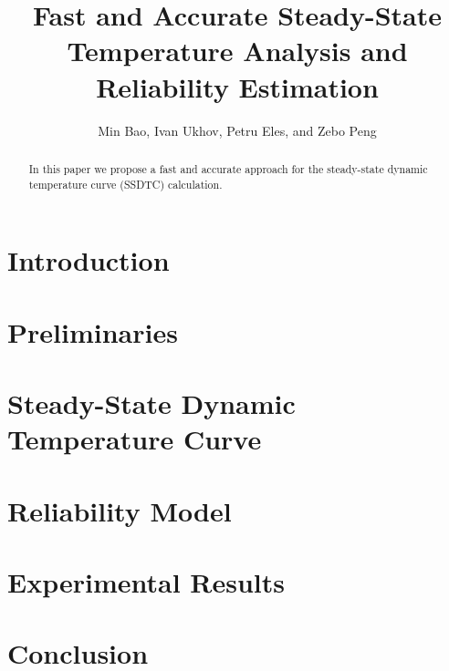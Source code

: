 \documentclass[conference]{IEEEtran}
\title{Fast and Accurate Steady-State Temperature Analysis and Reliability Estimation}
\author{Min Bao, Ivan Ukhov, Petru Eles, and Zebo Peng}
\newcommand{\ssdtc}{Steady-State Dynamic Temperature Curve}
\begin{document}
  \maketitle

  \begin{abstract}
    In this paper we propose a fast and accurate approach for the steady-state dynamic temperature curve (SSDTC) calculation.
  \end{abstract}

  \section{Introduction}
  

  \section{Preliminaries}
  

  \section{\ssdtc}
  

  \section{Reliability Model}
  

  \section{Experimental Results} \label{sec:results}
  

  \section{Conclusion}
  

  
\end{document}
